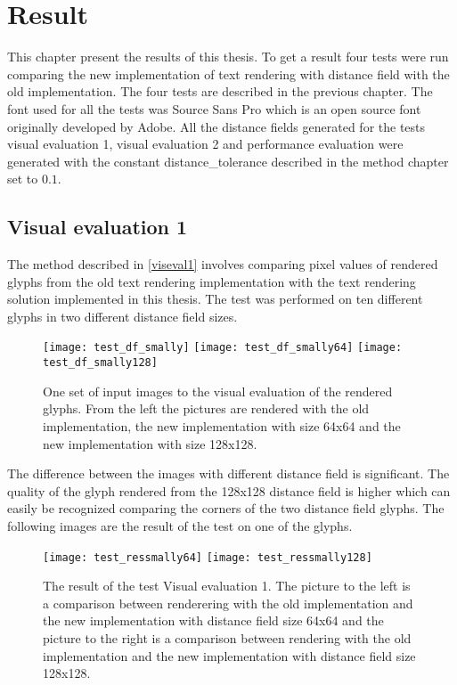 \chapter{Result}\label{cha:Research}
This chapter present the results of this thesis. To get a result four tests were run comparing the new implementation of text rendering with distance field with the old implementation. The four tests are described in the previous chapter. The font used for all the tests was Source Sans Pro which is an open source font originally developed by Adobe. All the distance fields generated for the tests visual evaluation 1, visual evaluation 2 and performance evaluation were generated with the constant distance\_tolerance described in the method chapter set to $0.1$.
\section{Visual evaluation 1}
The method described in \ref{viseval1} involves comparing pixel values of rendered glyphs from the old text rendering implementation with the text rendering solution implemented in this thesis. The test was performed on ten different glyphs in two different distance field sizes.

\begin{figure}[H]
  \texttt{[image: test\_df\_smally]}
\endminipage\hfill
{}
  \texttt{[image: test\_df\_smally64]}
\endminipage\hfill
{}
  \texttt{[image: test\_df\_smally128]}
\endminipage\hfill
\caption{One set of input images to the visual evaluation of the rendered glyphs. From the left the pictures are rendered with the old implementation, the new implementation with size 64x64 and the new implementation with size 128x128.}\label{fig:awesome_image2}
\end{figure}

The difference between the images with different distance field is significant. The quality of the glyph rendered from the 128x128 distance field is higher which can easily be recognized comparing the corners of the two distance field glyphs. The following images are the result of the test on one of the glyphs. 

\begin{figure}[H]
  \texttt{[image: test\_ressmally64]}
\endminipage\hfill
{}
  \texttt{[image: test\_ressmally128]}
\endminipage\hfill
\caption{The result of the test Visual evaluation 1. The picture to the left is a comparison between renderering with the old implementation and the new implementation with distance field size 64x64 and the picture to the right is a comparison between rendering with the old implementation and the new implementation with distance field size 128x128.}\label{fig:awesome_image2}
\end{figure}

